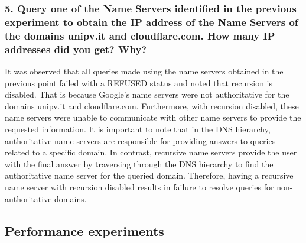 \documentclass[eng]{class}
\begin{document}
\subsubsection*{5. Query one of the Name Servers identified in the previous experiment to obtain the
  IP address of the Name Servers of the domains unipv.it and
  cloudflare.com. How many IP addresses did you get? Why?}
It was observed that all queries made using the name servers obtained in the previous point failed with a REFUSED status and noted that recursion is disabled.
That is because Google's name servers were not authoritative for the domains unipv.it and cloudflare.com.
Furthermore, with recursion disabled, these name servers were unable to communicate with other name servers to provide the requested information.\newline
It is important to note that in the DNS hierarchy, authoritative name servers are responsible for providing answers to queries related to a specific domain.
In contrast, recursive name servers provide the user with the final answer by traversing through the DNS hierarchy to find the authoritative name server for the queried domain.
Therefore, having a recursive name server with recursion disabled results in failure to resolve queries for non-authoritative domains.
\subsection{Performance experiments}
\end{document}
